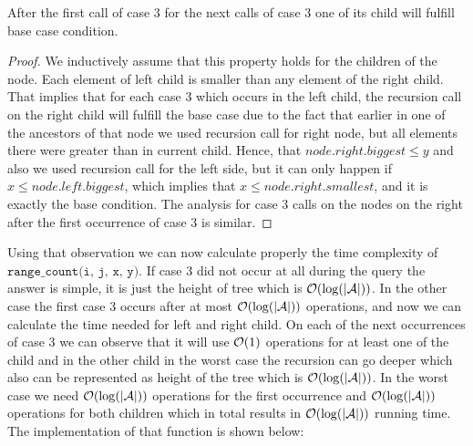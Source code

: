 \begin{observation}
    After the first call of case $3$ for the next calls of case $3$ one of its child will fulfill base case condition.
\end{observation}

\begin{proof}
    We inductively assume that this property holds for the children of the node. Each element of left child is smaller than any element of the right child. That implies that for each case $3$ which occurs in the left child, the recursion call on the right child will fulfill the base case due to the fact that earlier in one of the ancestors of that node we used recursion call for right node, but all elements there were greater than in current child. Hence, that $node.right.biggest \leq y$ and also we used recursion call for the left side, but it can only happen if $x \leq node.left.biggest$, which implies that $x \leq node.right.smallest$, and it is exactly the base condition. The analysis for case $3$ calls on the nodes on the right after the first occurrence of case $3$ is similar.
\end{proof}

Using that observation we can now calculate properly the time complexity of \\ $\texttt{range\_count(i, j, x, y)}$. If case $3$ did not occur at all during the query the answer is simple, it is just the height of tree which is $\mathcal{O}(\log(|\mathcal{A}|))$. In the other case the first case $3$ occurs after at most $\mathcal{O}(\log(|\mathcal{A}|))$ operations, and now we can calculate the time needed for left and right child. On each of the next occurrences of case $3$ we can observe that it will use $\mathcal{O}(1)$ operations for at least one of the child and in the other child in the worst case the recursion can go deeper which also can be represented as height of the tree which is $\mathcal{O}(\log(|\mathcal{A}|))$. In the worst case we need $\mathcal{O}(\log(|\mathcal{A}|))$ operations for the first occurrence and $\mathcal{O}(\log(|\mathcal{A}|))$ operations for both children which in total results in $\mathcal{O}(\log(|\mathcal{A}|))$ running time. The implementation of that function is shown below:

